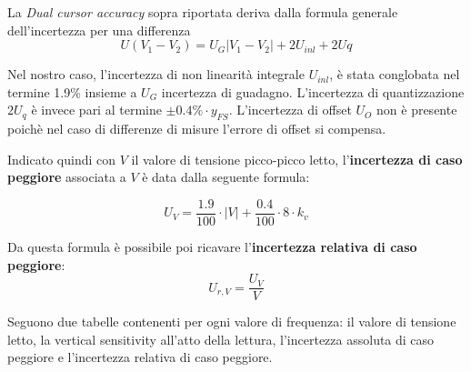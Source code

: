 La \emph{Dual cursor accuracy} sopra riportata deriva dalla formula generale dell'incertezza per una differenza 
\[U(V_1 - V_2) = U_G|V_1 - V_2| + 2U_{inl} + 2U{q}\]

Nel nostro caso, l'incertezza di non linearità integrale $U_{inl}$, è stata conglobata nel termine 1.9\% insieme a $U_G$ incertezza di guadagno. L'incertezza di quantizzazione $2U_q$ è invece pari al termine $\pm 0.4\% \cdot y_{FS}$. L'incertezza di offset $U_O$ non è presente poichè nel caso di differenze di misure l'errore di offset si compensa.

Indicato quindi con $V$ il valore di tensione picco-picco letto, l'\textbf{incertezza di caso peggiore} associata a $V$ è data dalla seguente formula:

\[U_V = \frac{1.9}{100} \cdot |V| + \frac{0.4}{100} \cdot 8 \cdot k_v\]

Da questa formula è possibile poi ricavare l'\textbf{incertezza relativa di caso peggiore}:
\[U_{r,V} = \frac{U_V}{V}\]

Seguono due tabelle contenenti per ogni valore di frequenza: il valore di tensione letto, la vertical sensitivity all'atto della lettura, l'incertezza assoluta di caso peggiore e l'incertezza relativa di caso peggiore.

